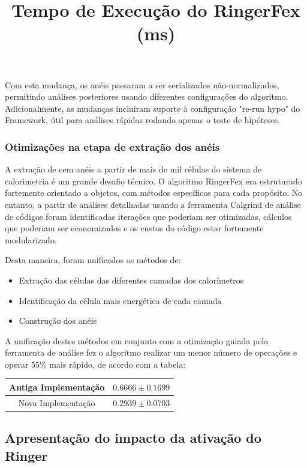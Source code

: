 \documentclass[a4paper,10pt,titlepage]{article}
\begin{document}
Com esta mudança, os anéis passaram a ser serializados não-normalizados, permitindo análises posteriores usando diferentes configurações do algoritmo.
Adicionalmente, as mudanças incluíram suporte à configuração "re-run hypo" do Framework, útil para análises rápidas rodando apenas o teste de hipóteses.

\subsubsection{Otimizações na etapa de extração dos anéis}

A extração de cem anéis a partir de mais de mil células do sistema de calorimetria é um grande desafio técnico.
O algoritmo RingerFex era estruturado fortemente orientado a objetos, com métodos específicos para cada propósito.
No entanto, a partir de análises detalhadas usando a ferramenta Calgrind de análise de códigos foram identificadas iterações que poderiam ser otimizadas, cálculos que poderiam ser economizados e os custos do código estar fortemente modularizado.

Desta maneira, foram unificados os métodos de:
\begin{itemize}
 \item Extração das células das diferentes camadas dos calorímetros
 \item Identificação da célula mais energética de cada camada
 \item Construção dos anéis
\end{itemize}

A unificação destes métodos em conjunto com a otimização guiada pela ferramenta de análise fez o algoritmo realizar um menor número de operações e operar 55\% mais rápido, de acordo com a tabela:

\begin{table}[htbp!]
 \centering
 \title{\textbf{Tempo de Execução do RingerFex (ms)}}
 \begin{tabular}{cc}
  \hline Antiga Implementação & $ 0.6666 \pm 0.1699 $\\
  \hline Nova Implementação & $ 0.2939 \pm 0.0703 $\\
 \end{tabular}
\end{table}

\clearpage

\subsection{Apresentação do impacto da ativação do Ringer}
\end{document}
